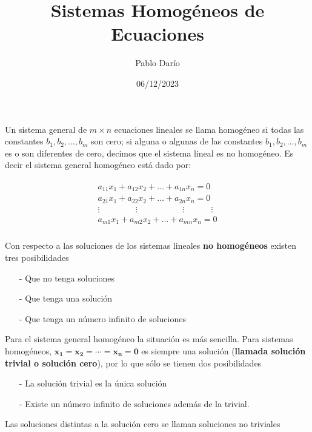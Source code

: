 \documentclass{article}
\title{Sistemas Homogéneos de Ecuaciones}
\author{Pablo Darío}
\date{06/12/2023}
\begin{document}
\maketitle

Un sistema general de $m \times n$ ecuaciones lineales se llama homogéneo si todas las constantes $b_1, b_2,\dots, b_m$ son cero; si alguna o algunas de las constantes  $b_1, b_2,\dots, b_m$ es o son diferentes de cero, decimos que el sistema lineal es no homogéneo. Es decir el sistema general homogéneo está dado por: 

\begin{equation*}
    \begin{matrix}
        \begin{aligned}
            a_{11}x_1 + a_{12}x_2 + \dots + a_{1n}x_n = 0\\
            a_{21}x_1 + a_{22}x_2 + \dots + a_{2n}x_n = 0\\
            \vdots \phantom{aaaaaaaa} \vdots \phantom{aaaaaaaaaa} \vdots \phantom{aaaaaa} \vdots\\
            a_{m1}x_1 + a_{m2}x_2 + \dots + a_{mn}x_n = 0\\
        \end{aligned}
    \end{matrix}
\end{equation*}

Con respecto a las soluciones de los sistemas lineales \textbf{no homogéneos} existen tres posibilidades
\begin{itemize}
    \item[-] Que no tenga soluciones
    \item[-] Que tenga una solución
    \item[-] Que tenga un número infinito de soluciones
\end{itemize}  

Para el sistema general homogéneo la situación es más sencilla. Para sistemas homogéneos, $\mathbf{x_1 = x_2 = \dotsb = x_n = 0}$ es siempre una solución (\textbf{llamada solución trivial o solución cero}), por lo que sólo se tienen dos posibilidades
\begin{itemize}
    \item[-] La solución trivial es la única solución
    \item[-] Existe un número infinito de soluciones además de la trivial.
\end{itemize} 
Las soluciones distintas a la solución cero se llaman soluciones no triviales
\end{document}
